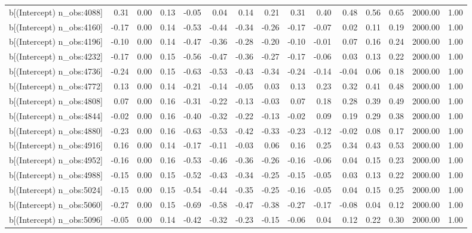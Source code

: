 \begin{table}[ht]
\begin{tabular}{rrrrrrrrrrrrrrr}
  b[(Intercept) n\_obs:4088] & 0.31 & 0.00 & 0.13 & -0.05 & 0.04 & 0.14 & 0.21 & 0.31 & 0.40 & 0.48 & 0.56 & 0.65 & 2000.00 & 1.00 \\ 
  b[(Intercept) n\_obs:4160] & -0.17 & 0.00 & 0.14 & -0.53 & -0.44 & -0.34 & -0.26 & -0.17 & -0.07 & 0.02 & 0.11 & 0.19 & 2000.00 & 1.00 \\ 
  b[(Intercept) n\_obs:4196] & -0.10 & 0.00 & 0.14 & -0.47 & -0.36 & -0.28 & -0.20 & -0.10 & -0.01 & 0.07 & 0.16 & 0.24 & 2000.00 & 1.00 \\ 
  b[(Intercept) n\_obs:4232] & -0.17 & 0.00 & 0.15 & -0.56 & -0.47 & -0.36 & -0.27 & -0.17 & -0.06 & 0.03 & 0.13 & 0.22 & 2000.00 & 1.00 \\ 
  b[(Intercept) n\_obs:4736] & -0.24 & 0.00 & 0.15 & -0.63 & -0.53 & -0.43 & -0.34 & -0.24 & -0.14 & -0.04 & 0.06 & 0.18 & 2000.00 & 1.00 \\ 
  b[(Intercept) n\_obs:4772] & 0.13 & 0.00 & 0.14 & -0.21 & -0.14 & -0.05 & 0.03 & 0.13 & 0.23 & 0.32 & 0.41 & 0.48 & 2000.00 & 1.00 \\ 
  b[(Intercept) n\_obs:4808] & 0.07 & 0.00 & 0.16 & -0.31 & -0.22 & -0.13 & -0.03 & 0.07 & 0.18 & 0.28 & 0.39 & 0.49 & 2000.00 & 1.00 \\ 
  b[(Intercept) n\_obs:4844] & -0.02 & 0.00 & 0.16 & -0.40 & -0.32 & -0.22 & -0.13 & -0.02 & 0.09 & 0.19 & 0.29 & 0.38 & 2000.00 & 1.00 \\ 
  b[(Intercept) n\_obs:4880] & -0.23 & 0.00 & 0.16 & -0.63 & -0.53 & -0.42 & -0.33 & -0.23 & -0.12 & -0.02 & 0.08 & 0.17 & 2000.00 & 1.00 \\ 
  b[(Intercept) n\_obs:4916] & 0.16 & 0.00 & 0.14 & -0.17 & -0.11 & -0.03 & 0.06 & 0.16 & 0.25 & 0.34 & 0.43 & 0.53 & 2000.00 & 1.00 \\ 
  b[(Intercept) n\_obs:4952] & -0.16 & 0.00 & 0.16 & -0.53 & -0.46 & -0.36 & -0.26 & -0.16 & -0.06 & 0.04 & 0.15 & 0.23 & 2000.00 & 1.00 \\ 
  b[(Intercept) n\_obs:4988] & -0.15 & 0.00 & 0.15 & -0.52 & -0.43 & -0.34 & -0.25 & -0.15 & -0.05 & 0.03 & 0.13 & 0.22 & 2000.00 & 1.00 \\ 
  b[(Intercept) n\_obs:5024] & -0.15 & 0.00 & 0.15 & -0.54 & -0.44 & -0.35 & -0.25 & -0.16 & -0.05 & 0.04 & 0.15 & 0.25 & 2000.00 & 1.00 \\ 
  b[(Intercept) n\_obs:5060] & -0.27 & 0.00 & 0.15 & -0.69 & -0.58 & -0.47 & -0.38 & -0.27 & -0.17 & -0.08 & 0.04 & 0.12 & 2000.00 & 1.00 \\ 
  b[(Intercept) n\_obs:5096] & -0.05 & 0.00 & 0.14 & -0.42 & -0.32 & -0.23 & -0.15 & -0.06 & 0.04 & 0.12 & 0.22 & 0.30 & 2000.00 & 1.00 \\ 

\end{tabular}
\end{table}
